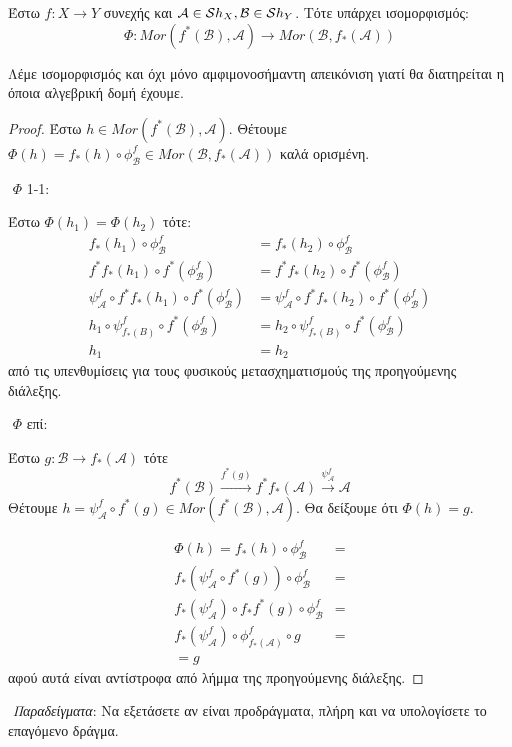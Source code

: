 \vspace*{0.3cm}
\begin{theorem}
    Έστω $f:X\longrightarrow Y$ συνεχής και $\mathcal{A} \in \mathcal{S} h_X, \mathcal{B} \in \mathcal{S} h_Y$. Τότε υπάρχει ισομορφισμός:
    $$\Phi: Mor(f^*(\mathcal{B}),\mathcal{A}) \longrightarrow Mor(\mathcal{B},f_*(\mathcal{A}))$$ 
\end{theorem}
\noindent Λέμε ισομορφισμός και όχι μόνο αμφιμονοσήμαντη απεικόνιση γιατί θα διατηρείται η όποια αλγεβρική δομή έχουμε.

\begin{proof}
    Έστω $h \in Mor(f^*(\mathcal{B}),\mathcal{A})$. Θέτουμε $\Phi(h) = f_*(h)\circ \phi^f_{\mathcal{B}} \in Mor(\mathcal{B},f_*(\mathcal{A}))$ καλά ορισμένη.

    $ $\newline
    $\Phi$ 1-1:

    \noindent Έστω $\Phi(h_1) = \Phi(h_2)$ τότε:
    \begin{align*}
        f_*(h_1) \circ \phi^f_{\mathcal{B}} &= f_*(h_2) \circ \phi^f_{\mathcal{B}} \\
        f^*f_*(h_1)\circ f^*(\phi^f_{\mathcal{B}}) &=  f^*f_*(h_2)\circ f^*(\phi^f_{\mathcal{B}}) \\
        \psi^f_{\mathcal{A}} \circ  f^*f_*(h_1)\circ f^*(\phi^f_{\mathcal{B}}) &=  \psi^f_{\mathcal{A} }\circ f^*f_*(h_2)\circ f^*(\phi^f_{\mathcal{B}}) \\
        h_1 \circ \psi^f_{f_*(B)} \circ f^*(\phi^f_{\mathcal{B}}) &= h_2 \circ \psi^f_{f_*(B)} \circ f^*(\phi^f_{\mathcal{B}}) \\
        h_1 &= h_2
    \end{align*}
    από τις υπενθυμίσεις για τους φυσικούς μετασχηματισμούς της προηγούμενης διάλεξης.

    $ $\newline
    $\Phi$ επί:

    \noindent Έστω $g:\mathcal{B}\longrightarrow f_*(\mathcal{A})$ τότε
    $$f^*(\mathcal{B}) \overset{f^*(g)}{\longrightarrow} f^*f_*(\mathcal{A}) \overset{\psi^f_{\mathcal{A}}}{\longrightarrow} \mathcal{A}$$ Θέτουμε $h = \psi^f_{\mathcal{A}} \circ f^*(g) \in Mor(f^*(\mathcal{B}),\mathcal{A})$. Θα δείξουμε ότι $\Phi(h) = g$.
    
    \begin{align*}
        \Phi(h) = f_*(h)\circ \phi^f_{\mathcal{B}} &= \\
        f_*(\psi^f_{\mathcal{A}} \circ f^*(g))\circ \phi^f_{\mathcal{B}} &= \\
        f_*(\psi^f_{\mathcal{A}})\circ f_*f^*(g) \circ \phi^f_{\mathcal{B}} &= \\
        f_*(\psi^f_{\mathcal{A}})\circ \phi^f_{f_*(\mathcal{A})} \circ g &= \\
         = g &
    \end{align*}
    \noindent αφού αυτά είναι αντίστροφα από λήμμα της προηγούμενης διάλεξης.
\end{proof}
\pagebreak
$ $\newline
{\em Παραδείγματα}: Να εξετάσετε αν είναι προδράγματα, πλήρη και να υπολογίσετε το επαγόμενο δράγμα.

